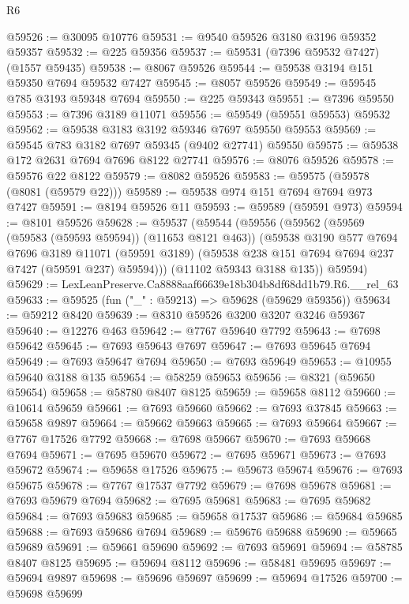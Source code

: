 \begin{lexlean}{R6}
\begin{coremodule}
@59526 := @30095 @10776
@59531 := @9540 @59526 @3180 @3196 @59352 @59357
@59532 := @225 @59356
@59537 := @59531 (@7396 @59532 @7427) (@1557 @59435)
@59538 := @8067 @59526
@59544 := @59538 @3194 @151 @59350 @7694 @59532 @7427
@59545 := @8057 @59526
@59549 := @59545 @785 @3193 @59348 @7694
@59550 := @225 @59343
@59551 := @7396 @59550
@59553 := @7396 @3189 @11071
@59556 := @59549 (@59551 @59553) @59532
@59562 := @59538 @3183 @3192 @59346 @7697 @59550 @59553
@59569 := @59545 @783 @3182 @7697 @59345 (@9402 @27741) @59550
@59575 := @59538 @172 @2631 @7694 @7696 @8122 @27741
@59576 := @8076 @59526
@59578 := @59576 @22 @8122
@59579 := @8082 @59526
@59583 := @59575 (@59578 (@8081 (@59579 @22)))
@59589 := @59538 @974 @151 @7694 @7694 @973 @7427
@59591 := @8194 @59526 @11
@59593 := @59589 (@59591 @973)
@59594 := @8101 @59526
@59628 := @59537
    (@59544
      (@59556
        (@59562
          (@59569 (@59583 (@59593 @59594)) (@11653 @8121 @463))
          (@59538
            @3190
            @577
            @7694
            @7696
            @3189
            @11071
            (@59591 @3189)
            (@59538 @238 @151 @7694 @7694 @237 @7427 (@59591 @237) @59594)))
        (@11102 @59343 @3188 @135))
      @59594)
@59629 := LexLeanPreserve.Ca8888aaf66639e18b304b8df68dd1b79.R6.__rel_63
@59633 := @59525 (fun ("_" : @59213) => @59628 (@59629 @59356))
@59634 := @59212 @8420
@59639 := @8310 @59526 @3200 @3207 @3246 @59367
@59640 := @12276 @463
@59642 := @7767 @59640 @7792
@59643 := @7698 @59642
@59645 := @7693 @59643 @7697
@59647 := @7693 @59645 @7694
@59649 := @7693 @59647 @7694
@59650 := @7693 @59649
@59653 := @10955 @59640 @3188 @135
@59654 := @58259 @59653
@59656 := @8321 (@59650 @59654)
@59658 := @58780 @8407 @8125
@59659 := @59658 @8112
@59660 := @10614 @59659
@59661 := @7693 @59660
@59662 := @7693 @37845
@59663 := @59658 @9897
@59664 := @59662 @59663
@59665 := @7693 @59664
@59667 := @7767 @17526 @7792
@59668 := @7698 @59667
@59670 := @7693 @59668 @7694
@59671 := @7695 @59670
@59672 := @7695 @59671
@59673 := @7693 @59672
@59674 := @59658 @17526
@59675 := @59673 @59674
@59676 := @7693 @59675
@59678 := @7767 @17537 @7792
@59679 := @7698 @59678
@59681 := @7693 @59679 @7694
@59682 := @7695 @59681
@59683 := @7695 @59682
@59684 := @7693 @59683
@59685 := @59658 @17537
@59686 := @59684 @59685
@59688 := @7693 @59686 @7694
@59689 := @59676 @59688
@59690 := @59665 @59689
@59691 := @59661 @59690
@59692 := @7693 @59691
@59694 := @58785 @8407 @8125
@59695 := @59694 @8112
@59696 := @58481 @59695
@59697 := @59694 @9897
@59698 := @59696 @59697
@59699 := @59694 @17526
@59700 := @59698 @59699

\end{coremodule}
\end{lexlean}
